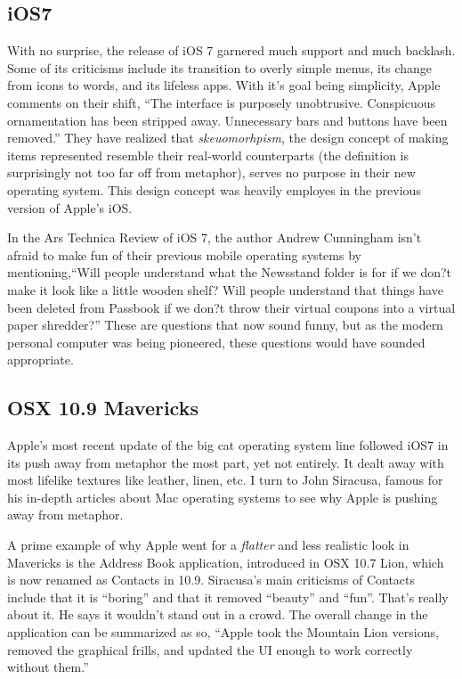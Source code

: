 \documentclass[11pt, oneside]{article}
\begin{document}
\subsection{iOS7}
With no surprise, the release of iOS 7 garnered much support and much backlash. Some of its criticisms include its transition to overly simple menus, its change from icons to words, and its lifeless apps. With it's goal being simplicity, Apple comments on their shift, ``The interface is purposely unobtrusive. Conspicuous ornamentation has been stripped away. Unnecessary bars and buttons have been removed.'' \cite{apple-design} They have realized that \textit{skeuomorhpism}, the design concept of making items represented resemble their real-world counterparts (the definition is surprisingly not too far off from metaphor), serves no purpose in their new operating system. This design concept was heavily employes in the previous version of Apple's iOS.

In the Ars Technica Review of iOS 7, the author Andrew Cunningham isn't afraid to make fun of their previous mobile operating systems by mentioning,``Will people understand what the Newsstand folder is for if we don?t make it look like a little wooden shelf? Will people understand that things have been deleted from Passbook if we don?t throw their virtual coupons into a virtual paper shredder?'' \cite{ars-technica-iOS7} These are questions that now sound funny, but as the modern personal computer was being pioneered, these questions would have sounded appropriate.

\subsection{OSX 10.9 Mavericks}
Apple's most recent update of the big cat operating system line followed iOS7 in its push away from metaphor the most part, yet not entirely. It dealt away with most lifelike textures like leather, linen, etc. I turn to John Siracusa, famous for his in-depth articles about Mac operating systems to see why Apple is pushing away from metaphor.

A prime example of why Apple went for a \textit{flatter} and less realistic look in Mavericks is the Address Book application, introduced in OSX 10.7 Lion, which is now renamed as Contacts in 10.9. Siracusa's main criticisms of Contacts include that it is ``boring'' and that it removed ``beauty'' and ``fun''. That's really about it. He says it wouldn't stand out in a crowd. The overall change in the application can be summarized as so, ``Apple took the Mountain Lion versions, removed the graphical frills, and updated the UI enough to work correctly without them.'' \cite{ars-technica-mavericks} 
\end{document}
